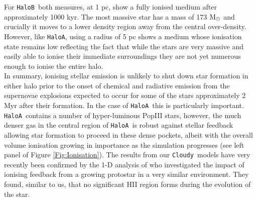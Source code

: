 \documentclass[twocolumn,iop,revtex4]{openjournal}
\newcommand{\cloudy}{\texttt{Cloudy~}}
\newcommand{\msolar} {$\rm{M_{\odot}}~$}
\newcommand{\ha} {\texttt{HaloA~}}
\newcommand{\hb} {\texttt{HaloB~}}
\newcommand{\hac} {\texttt{HaloA}}
\begin{document}
\indent For \hb both measures, at 1 pc,  show a fully ionised medium
after approximately 1000 kyr. The most massive star has a mass of 173 \msolar and crucially
it moves to a lower
density region away from the central over-density. However, like \hac, using a radius of 5 pc shows
a medium whose ionisation state remains low reflecting the fact that while the stars are very
massive and easily able to ionise their immediate surroundings they are not yet numerous enough
to ionise the entire halo. \\
\indent In summary, ionising stellar emission is unlikely to shut down star formation in
either halo prior to the onset of chemical and radiative emission from the supernovae
explosions expected to occur for some of the stars \citep[e.g. see][]{Heger_2003}
approximately 2 Myr  after their formation. In
the case of \ha this is particularly important. \ha contains a number of hyper-luminous PopIII stars,
however, the much denser gas in the central region of \ha is robust against stellar feedback
allowing star formation to proceed in these dense pockets, 
albeit with the overall volume ionisation growing in importance as the simulation progresses
(see left panel of Figure \ref{Fig:Ionisation}). The results from our \cloudy models have
  very recently been confirmed by the 1-D analysis of \cite{Sakurai_2020} who investigated the
impact of ionising feedback from a growing protostar in a very similar environment. They found,
similar to us, that no significant HII region forms during the evolution of the star. 


\end{document}

